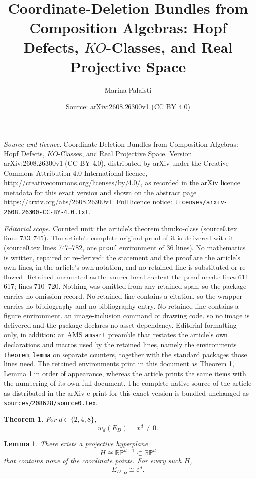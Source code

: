 \documentclass[10pt,a4paper]{amsart}
\title{Coordinate-Deletion Bundles from Composition Algebras: Hopf Defects, $KO$-Classes, and Real Projective Space}
\author{Marina Palaisti}
\date{Source: arXiv:2608.26300v1 (CC BY 4.0)}
\newtheorem{theorem}{Theorem}
\newtheorem{lemma}{Lemma}
\newcommand{\RP}{\mathbb{RP}}
\begin{document}
\maketitle

\noindent\emph{Source and licence.} Coordinate-Deletion Bundles from Composition Algebras: Hopf Defects, $KO$-Classes, and Real Projective Space. Version arXiv:2608.26300v1 (CC BY 4.0), distributed by arXiv under the Creative Commons Attribution 4.0 International licence, http://creativecommons.org/licenses/by/4.0/, as recorded in the arXiv licence metadata for this exact version and shown on the abstract page https://arxiv.org/abs/2608.26300v1. Full licence notice: \texttt{licenses/arxiv-2608.26300-CC-BY-4.0.txt}.\par\smallskip

\noindent\textit{Editorial scope.} Counted unit: the article's theorem thm:ko-class (source0.tex lines 733--745). The article's complete original proof of it is delivered with it (source0.tex lines 747--782, one \texttt{proof} environment of 36 lines). No mathematics is written, repaired or re-derived: the statement and the proof are the article's own lines, in the article's own notation, and no retained line is substituted or re-flowed.  Retained uncounted as the source-local context the proof needs: lines 611--617; lines 710--720.  Nothing was omitted from any retained span, so the package carries no omission record.  No retained line contains a citation, so the wrapper carries no bibliography and no bibliography entry.  No retained line contains a figure environment, an image-inclusion command or drawing code, so no image is delivered and the package declares no asset dependency.  Editorial formatting only, in addition: an AMS \texttt{amsart} preamble that restates the article's own declarations and macros used by the retained lines, namely the environments \texttt{theorem}, \texttt{lemma} on separate counters, together with the standard packages those lines need.  The retained environments print in this document as Theorem 1, Lemma 1 in order of appearance, whereas the article prints the same items with the numbering of its own full document.  The complete native source of the article as distributed in the arXiv e-print for this exact version is bundled unchanged as \texttt{sources/208628/source0.tex}.
\begin{theorem}
	\label{thm:top-class}
	For $d\in\{2,4,8\}$,
	\[
	w_d(E_D)=x^d\ne0.
	\]
\end{theorem}

\begin{lemma}
	\label{lem:generic-hyperplane}
	There exists a projective hyperplane
	\[
	H\cong\RP^{d-1}\subset\RP^d
	\]
	that contains none of the coordinate points. For every such $H$,
	\[
	E_D|_H\cong\varepsilon^d.
	\]
\end{lemma}
\end{document}
